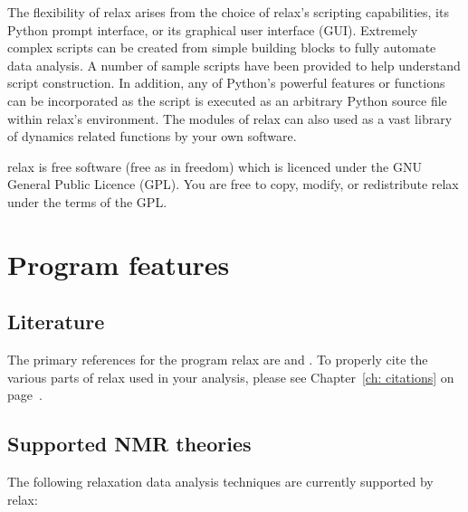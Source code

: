 The flexibility of relax arises from the choice of relax's scripting capabilities, its Python prompt interface, or its graphical user interface (GUI).
Extremely complex scripts can be created from simple building blocks to fully automate data analysis.
A number of sample scripts have been provided to help understand script construction.
In addition, any of Python's powerful features or functions can be incorporated as the script is executed as an arbitrary Python source file within relax's environment.
The modules of relax can also used as a vast library of dynamics related functions by your own software.

relax is free software (free as in freedom) which is licenced under the GNU General Public Licence (GPL).
You are free to copy, modify, or redistribute relax under the terms of the GPL.



\section{Program features}



\subsection{Literature}

The primary references for the program relax are \citet{dAuvergneGooley08a} and \citet{dAuvergneGooley08b}.
To properly cite the various parts of relax used in your analysis, please see Chapter~\ref{ch: citations} on page~\pageref{ch: citations}.



\subsection{Supported NMR theories}

The following relaxation data analysis techniques are currently supported by relax:

